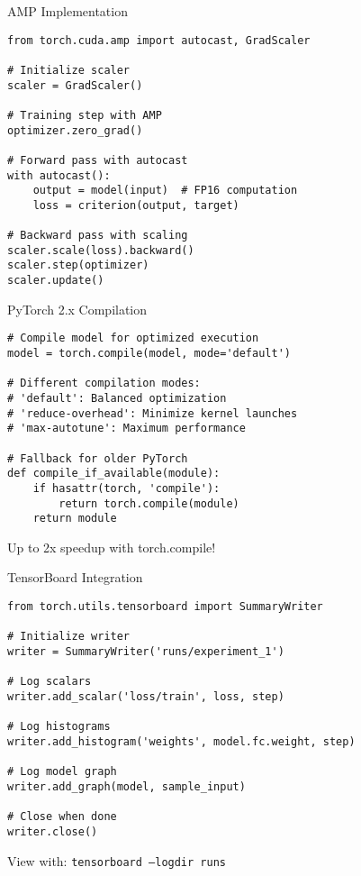 \documentclass[aspectratio=169,10pt]{beamer}
\begin{document}
\begin{frame}[fragile]{AMP Implementation}
\begin{lstlisting}
from torch.cuda.amp import autocast, GradScaler

# Initialize scaler
scaler = GradScaler()

# Training step with AMP
optimizer.zero_grad()

# Forward pass with autocast
with autocast():
    output = model(input)  # FP16 computation
    loss = criterion(output, target)

# Backward pass with scaling
scaler.scale(loss).backward()
scaler.step(optimizer)
scaler.update()
\end{lstlisting}
\end{frame}

\begin{frame}[fragile]{PyTorch 2.x Compilation}
\begin{lstlisting}
# Compile model for optimized execution
model = torch.compile(model, mode='default')

# Different compilation modes:
# 'default': Balanced optimization
# 'reduce-overhead': Minimize kernel launches  
# 'max-autotune': Maximum performance

# Fallback for older PyTorch
def compile_if_available(module):
    if hasattr(torch, 'compile'):
        return torch.compile(module)
    return module
\end{lstlisting}

Up to 2x speedup with torch.compile!
\end{frame}

\begin{frame}[fragile]{TensorBoard Integration}
\begin{lstlisting}
from torch.utils.tensorboard import SummaryWriter

# Initialize writer
writer = SummaryWriter('runs/experiment_1')

# Log scalars
writer.add_scalar('loss/train', loss, step)

# Log histograms
writer.add_histogram('weights', model.fc.weight, step)

# Log model graph
writer.add_graph(model, sample_input)

# Close when done
writer.close()
\end{lstlisting}

View with: \texttt{tensorboard --logdir runs}
\end{frame}
\end{document}
